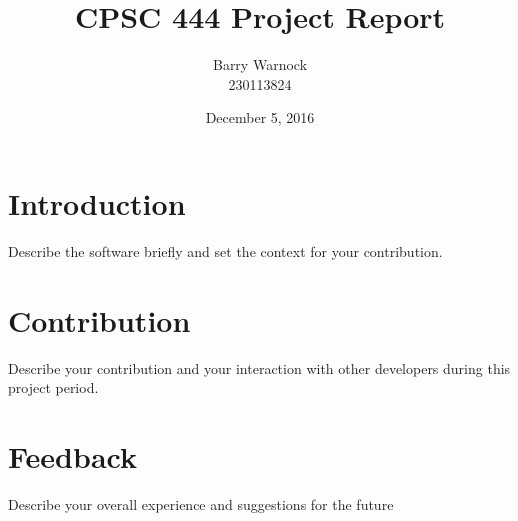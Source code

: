 \documentclass{article}
\begin{document}
\title{CPSC 444 Project Report}
\author{Barry Warnock\\
  230113824}
\date{December 5, 2016}
\maketitle


\section*{Introduction}
Describe the software briefly and set the context for your contribution.

\section*{Contribution}
Describe your contribution and your interaction with other developers
during this project period.

\section*{Feedback}
Describe your overall experience and suggestions for the future
\end{document}
